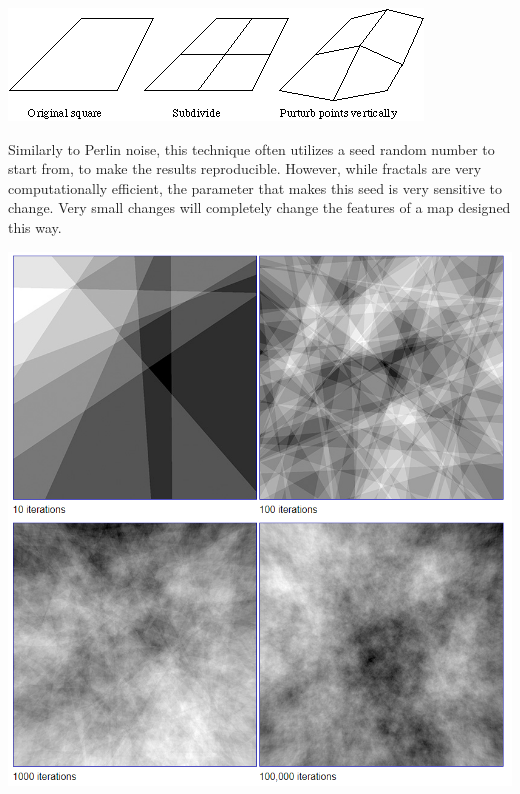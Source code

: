 \documentclass[10pt]{report}
\begin{document}
		\begin{minipage}{\textwidth}
			\centering
			\includegraphics[scale=1]{landscapes}
			\label{fig:spatsub}
		\end{minipage}
		
		Similarly to Perlin noise, this technique often utilizes a seed random number to start from, to make the results reproducible. However, while fractals are very computationally efficient, the parameter that makes this seed is very sensitive to change. Very small changes will completely change the features of a map designed this way.
		
		\begin{minipage}{\textwidth}
			\centering
			\includegraphics[scale=.5]{fractal-noise}
			\label{fig:fig2}
		\end{minipage}
		
\end{document}
